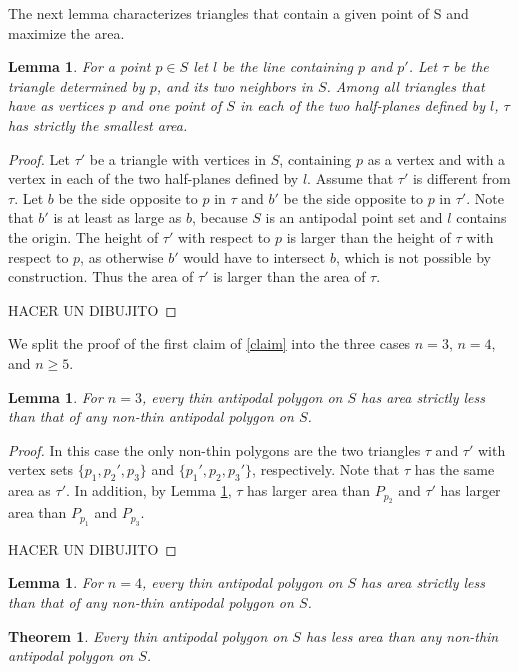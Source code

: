 \documentclass[twoside]{article}
\newtheorem{lem}[defin]{Lemma}
\newtheorem{thm}[defin]{Theorem}
\begin{document}
The next lemma characterizes triangles that contain a given point of S and maximize
the area.

\begin{lem}\label{1}
For a point $p ∈ S$ let $l$ be the line containing $p$ and $p'$. Let $τ$ be the triangle
determined by $p$, and its two neighbors in $S$. Among all triangles that have as vertices
$p$ and one point of $S$ in each of the two half-planes defined by $l$, $τ$ has strictly the
smallest area.
\end{lem}
\begin{proof}
Let $τ'$ be a triangle with vertices in $S$, containing $p$ as a vertex and with a vertex
in each of the two half-planes defined by $l$. Assume that $τ'$ is different from $τ$. Let
$b$ be the side opposite to $p$ in $τ$ and $b'$ be the side opposite to $p$ in $τ'$. Note that $b'$
is at least as large as $b$, because $S$ is an antipodal point set and $l$ contains the origin.
The height of $τ'$ with respect to $p$ is larger than the height of $τ$ with respect to $p$, as
otherwise $b'$ would have to intersect $b$, which is not possible by construction. Thus
the area of $τ'$ is larger than the area of $τ$.

HACER UN DIBUJITO
\end{proof}


We split the proof of the first claim of \ref{claim} into the three cases $n = 3$, $n = 4$, and $n ≥ 5$.

\begin{lem}\label{2}
For $n = 3$, every thin antipodal polygon on $S$ has area strictly less than
that of any non-thin antipodal polygon on $S$.
\end{lem}
\begin{proof}
In this case the only non-thin polygons are the two triangles $τ$ and $τ'$ with vertex
sets $\{p_1, p_2', p_3\}$ and $\{p_1', p_2, p_3'\}$, respectively. Note that $τ$ has the same area as $τ'$.
In addition, by Lemma \ref{1}, $τ$ has larger area than $P_{p_2}$ and $τ'$ has larger area than $P_{p_1}$
and $P_{p_3}$.

HACER UN DIBUJITO
\end{proof}


\begin{lem}\label{3}
For $n = 4$, every thin antipodal polygon on $S$ has area strictly less than
that of any non-thin antipodal polygon on $S$.
\end{lem}


\begin{thm}
Every thin antipodal polygon on $S$ has less area than any non-thin antipodal
polygon on $S$.
\end{thm}
\end{document}
